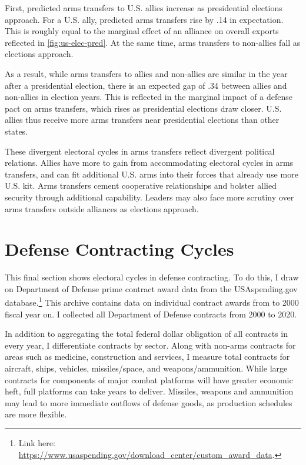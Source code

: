 \documentclass[12pt]{article}
\begin{document}
First, predicted arms transfers to U.S. allies increase as presidential elections approach.
For a U.S. ally, predicted arms transfers rise by .14 in expectation. 
This is roughly equal to the marginal effect of an alliance on overall exports reflected in \autoref{fig:us-elec-pred}.
At the same time, arms transfers to non-allies fall as elections approach. 


As a result, while arms transfers to allies and non-allies are similar in the year after a presidential election, there is an expected gap of .34 between allies and non-allies in election years.
This is reflected in the marginal impact of a defense pact on arms transfers, which rises as presidential elections draw closer.
U.S. allies thus receive more arms transfers near presidential elections than other states.


These divergent electoral cycles in arms transfers reflect divergent political relations.
Allies have more to gain from accommodating electoral cycles in arms transfers, and can fit additional U.S. arms into their forces that already use more U.S. kit.
Arms transfers cement cooperative relationships and bolster allied security through additional capability.
Leaders may also face more scrutiny over arms transfers outside alliances as elections approach. 



\section{Defense Contracting Cycles}


This final section shows electoral cycles in defense contracting. 
To do this, I draw on Department of Defense prime contract award data from the USAspending.gov database.\footnote{Link here: \url{https://www.usaspending.gov/download_center/custom_award_data}.} 
This archive contains data on individual contract awards from to 2000 fiscal year on.
I collected all Department of Defense contracts from 2000 to 2020.


In addition to aggregating the total federal dollar obligation of all contracts in every year, I differentiate contracts by sector.
Along with non-arms contracts for areas such as medicine, construction and services, I measure total contracts for aircraft, ships, vehicles, missiles/space, and weapons/ammunition. 
While large contracts for components of major combat platforms will have greater economic heft, full platforms can take years to deliver. 
Missiles, weapons and ammunition may lead to more immediate outflows of defense goods, as production schedules are more flexible.
\end{document}
